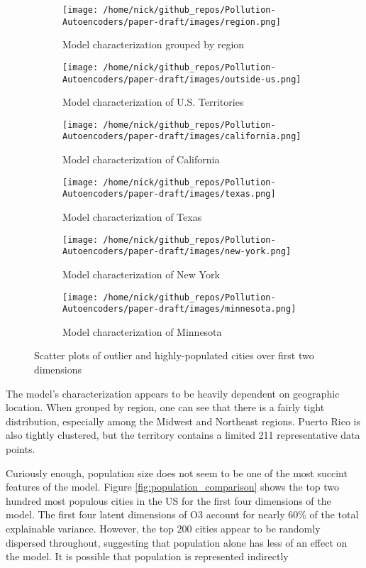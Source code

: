 \documentclass{article}
\begin{document}
\begin{figure}[h!]
\begin{subfigure}{0.5\textwidth}
    \texttt{[image: /home/nick/github\_repos/Pollution-Autoencoders/paper-draft/images/region.png]} 
    \caption{Model characterization grouped by region}
\end{subfigure}
\begin{subfigure}{0.5\textwidth}
    \texttt{[image: /home/nick/github\_repos/Pollution-Autoencoders/paper-draft/images/outside-us.png]}
    \caption{Model characterization of U.S. Territories}
\end{subfigure}
\begin{subfigure}{0.5\textwidth}
    \texttt{[image: /home/nick/github\_repos/Pollution-Autoencoders/paper-draft/images/california.png]} 
    \caption{Model characterization of California}
\end{subfigure}
\begin{subfigure}{0.5\textwidth}
    \texttt{[image: /home/nick/github\_repos/Pollution-Autoencoders/paper-draft/images/texas.png]} 
    \caption{Model characterization of Texas}
\end{subfigure}
\begin{subfigure}{0.5\textwidth}
    \texttt{[image: /home/nick/github\_repos/Pollution-Autoencoders/paper-draft/images/new-york.png]}
    \caption{Model characterization of New York}
\end{subfigure}
\begin{subfigure}{0.5\textwidth}
    \texttt{[image: /home/nick/github\_repos/Pollution-Autoencoders/paper-draft/images/minnesota.png]}
    \caption{Model characterization of Minnesota}
\end{subfigure}
\caption{Scatter plots of outlier and highly-populated cities over first two dimensions}
\label{fig:heuristic_labels}
\end{figure}

\newpage
\par The model's characterization appears to be heavily dependent on geographic location. When grouped by region, one can see that there is a fairly tight distribution, especially among the Midwest and Northeast regions. Puerto Rico is also tightly clustered, but the territory contains a limited 211 representative data points.

\par Curiously enough, population size does not seem to be one of the most succint features of the model. Figure \ref{fig:population_comparison} shows the top two hundred most populous cities in the US for the first four dimensions of the model. The first four latent dimensions of O3 account for nearly 60\% of the total explainable variance. However, the top 200 cities appear to be randomly dispersed throughout, suggesting that population alone has less of an effect on the model. It is possible that population is represented indirectly
\end{document}
